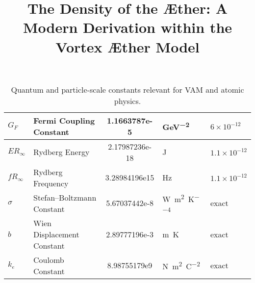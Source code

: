 \begin{table}[H]
\begin{tabular}{|l|l|S[scientific-notation = true] |l|l|}
        $G_F$ & Fermi Coupling Constant & 1.1663787e-5 & \si{\giga\electronvolt^{-2}} & $6 \times 10^{-12}$ \\ \hline
        $ER_\infty$ & Rydberg Energy & 2.17987236e-18 & \si{\joule} & $1.1 \times 10^{-12}$ \\ \hline
        $fR_\infty$ & Rydberg Frequency & 3.28984196e15 & \si{\hertz} & $1.1 \times 10^{-12}$ \\ \hline
        $\sigma$ & Stefan–Boltzmann Constant & 5.67037442e-8 & \si{\watt\per\meter\squared\per\kelvin^4} & exact \\ \hline
        $b$ & Wien Displacement Constant & 2.89777196e-3 & \si{\meter\kelvin} & exact \\ \hline
        $k_e$ & Coulomb Constant & 8.98755179e9 & \si{\newton\meter\squared\per\coulomb\squared} & exact \\ \hline
    \end{tabular}
    \caption{Quantum and particle-scale constants relevant for VAM and atomic physics.}
    \label{tab:quantum_constants}
\end{table}



\documentclass[12pt]{article}
\usepackage{amsmath,amsfonts}
\usepackage{graphicx}
\usepackage{cite}
\usepackage{hyperref}
\hypersetup{colorlinks=true, linkcolor=blue, citecolor=blue, urlcolor=blue}

\title{The Density of the Æther: A Modern Derivation within the Vortex Æther Model}
\author{}
\date{}



\maketitle

\begin{abstract}
This article refines previous estimates of the Æther's density, $\rho_{\text{\ae}}$, in the Vortex Æther Model (VAM). Integrating findings from quantum vortex dynamics, superfluid helium, gravitomagnetic frame-dragging, and cosmological vacuum energy, we propose constrained ranges for $\rho_{\text{\ae}}^{\text{(fluid)}}$ and $\rho_{\text{\ae}}^{\text{(energy)}}$ and examine their implications across scales.
\end{abstract}

\section{Introduction}

